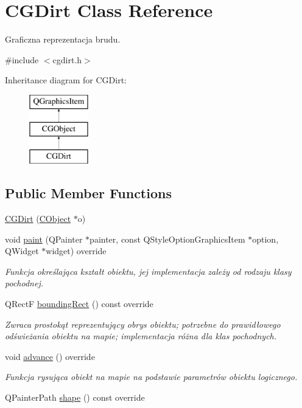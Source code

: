 \hypertarget{class_c_g_dirt}{}\section{C\+G\+Dirt Class Reference}
\label{class_c_g_dirt}


Graficzna reprezentacja brudu.  




{\ttfamily \#include $<$cgdirt.\+h$>$}

Inheritance diagram for C\+G\+Dirt\+:\begin{figure}[H]
\begin{center}
\leavevmode
\includegraphics[height=3.000000cm]{class_c_g_dirt}
\end{center}
\end{figure}
\subsection*{Public Member Functions}
\begin{DoxyCompactItemize}
\item 
\mbox{\hyperlink{class_c_g_dirt_ad57eda78ac27258e3c951434bdbabcbb}{C\+G\+Dirt}} (\mbox{\hyperlink{class_c_object}{C\+Object}} $\ast$o)
\item 
void \mbox{\hyperlink{class_c_g_dirt_a46b019eb8693b85447149170178f8643}{paint}} (Q\+Painter $\ast$painter, const Q\+Style\+Option\+Graphics\+Item $\ast$option, Q\+Widget $\ast$widget) override
\begin{DoxyCompactList}\small\item\em Funkcja określająca kształt obiektu, jej implementacja zależy od rodzaju klasy pochodnej. \end{DoxyCompactList}\item 
Q\+RectF \mbox{\hyperlink{class_c_g_dirt_aa7ff4b489e4fdbdaa456b40394b635f1}{bounding\+Rect}} () const override
\begin{DoxyCompactList}\small\item\em Zwraca prostokąt reprezentujący obrys obiektu; potrzebne do prawidłowego odświeżania obiektu na mapie; implementacja różna dla klas pochodnych. \end{DoxyCompactList}\item 
void \mbox{\hyperlink{class_c_g_dirt_a871068d11fec47d09635b8992b11f7c9}{advance}} () override
\begin{DoxyCompactList}\small\item\em Funkcja rysująca obiekt na mapie na podstawie parametrów obiektu logicznego. \end{DoxyCompactList}\item 
Q\+Painter\+Path \mbox{\hyperlink{class_c_g_dirt_abb94f12edfcd4b6ff07b02ed1dea98f9}{shape}} () const override
\end{DoxyCompactItemize}
